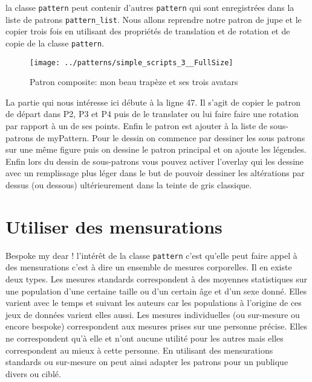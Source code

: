 \documentclass[10pt,a4paper,twoside]{report}
\begin{document}
la classe \texttt{pattern} peut contenir d'autres \texttt{pattern} qui sont enregistrées dans la liste de patrons \texttt{pattern\_list}. Nous allons reprendre notre patron de jupe et le copier trois fois en utilisant des propriétés de translation et de rotation et de copie de la classe \texttt{pattern}.




\begin{figure}
\begin{center}
\texttt{[image: ../patterns/simple\_scripts\_3\_\_FullSize]}
\end{center}
\caption{Patron composite: mon beau trapèze et ses trois avatars}
\label{fig:trapeze}
\end{figure}

La partie qui nous intéresse ici débute à la ligne 47. Il s'agit de copier le patron de départ dans P2, P3 et P4 puis de le translater ou lui faire faire une rotation par rapport à un de ses points. Enfin le patron est ajouter à la liste de sous-patrons de myPattern. Pour le dessin on commence par dessiner les sous patrons sur une même figure puis on dessine le patron principal et on ajoute les légendes. Enfin lors du dessin de sous-patrons vous pouvez activer l'overlay qui les dessine avec un remplissage plus léger dans le but de pouvoir dessiner les altérations par dessus (ou dessous) ultérieurement dans la teinte de gris classique.


\section{Utiliser des mensurations}

Bespoke my dear ! l'intérêt de la classe \texttt{pattern} c'est qu'elle peut faire appel à des mensurations c'est à dire un ensemble de mesures corporelles. Il en existe deux types. Les mesures standards correspondent à des moyennes statistiques sur une population d'une certaine taille ou d'un certain âge et d'un sexe donné. Elles varient avec le temps et suivant les auteurs car les populations à l'origine de ces jeux de données varient elles aussi. Les mesures individuelles (ou sur-mesure ou encore bespoke) correspondent aux mesures prises sur une personne précise. Elles ne correspondent qu'à elle et n'ont aucune utilité pour les autres mais elles correspondent au mieux à cette personne.
En utilisant des mensurations standards ou sur-mesure on peut ainsi adapter les patrons pour un publique divers ou ciblé.
\end{document}
